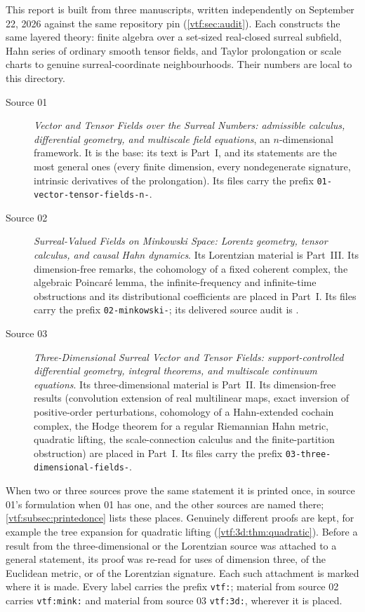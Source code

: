 \documentclass[11pt,letterpaper]{article}
\theoremstyle{definition}
\theoremstyle{remark}
\begin{document}
This report is built from three manuscripts, written independently on
September 22, 2026 against the same repository pin (\cref{vtf:sec:audit}).
Each constructs the same layered theory: finite algebra over a set-sized
real-closed surreal subfield, Hahn series of ordinary smooth tensor fields, and
Taylor prolongation or scale charts to genuine surreal-coordinate
neighbourhoods. Their numbers are local to this directory.
\begin{description}
\item[Source 01] \emph{Vector and Tensor Fields over the Surreal Numbers:
admissible calculus, differential geometry, and multiscale field equations},
an $n$-dimensional framework. It is the base: its text is Part~I, and its
statements are the most general ones (every finite dimension, every
nondegenerate signature, intrinsic derivatives of the prolongation). Its files
carry the prefix \texttt{01-vector-tensor-fields-n-}.
\item[Source 02] \emph{Surreal-Valued Fields on Minkowski Space: Lorentz
geometry, tensor calculus, and causal Hahn dynamics}. Its Lorentzian material is
Part~III. Its dimension-free remarks, the cohomology of a fixed coherent
complex, the algebraic Poincar\'e lemma, the infinite-frequency and
infinite-time obstructions and its distributional coefficients are placed in
Part~I. Its files carry the prefix \texttt{02-minkowski-}; its delivered source
audit is .
\item[Source 03] \emph{Three-Dimensional Surreal Vector and Tensor Fields:
support-controlled differential geometry, integral theorems, and multiscale
continuum equations}. Its three-dimensional material is Part~II. Its
dimension-free results (convolution extension of real multilinear maps, exact
inversion of positive-order perturbations, cohomology of a Hahn-extended
cochain complex, the Hodge theorem for a regular Riemannian Hahn metric,
quadratic lifting, the scale-connection calculus and the finite-partition
obstruction) are placed in Part~I. Its files carry the prefix
\texttt{03-three-dimensional-fields-}.
\end{description}
When two or three sources prove the same statement it is printed once, in
source 01's formulation when 01 has one, and the other sources are named
there; \cref{vtf:subsec:printedonce} lists these places. Genuinely different
proofs are kept, for example the tree expansion for quadratic lifting
(\cref{vtf:3d:thm:quadratic}). Before a result from the three-dimensional or
the Lorentzian source was attached to a general statement, its proof was
re-read for uses of dimension three, of the Euclidean metric, or of the
Lorentzian signature. Each such attachment is marked where it is made. Every
label carries the prefix \texttt{vtf:}; material from source 02 carries
\texttt{vtf:mink:} and material from source 03 \texttt{vtf:3d:}, wherever it is
placed.
\end{document}
